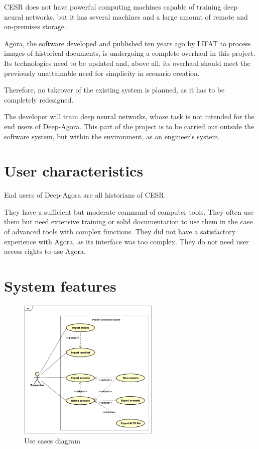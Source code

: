 \documentclass{polytech/polytech}
\numberwithin{figure}{chapter}
\begin{document}
CESR does not have powerful computing machines capable of training deep neural networks, but it has several machines and a large amount of remote and on-premises storage.

Agora, the software developed and published ten years ago by LIFAT to process images of historical documents, is undergoing a complete overhaul in this project. Its technologies need to be updated and, above all, its overhaul should meet the previously unattainable need for simplicity in scenario creation.

Therefore, no takeover of the existing system is planned, as it has to be completely redesigned.

The developer will train deep neural networks, whose task is not intended for the end users of Deep-Agora. This part of the project is to be carried out outside the software system, but within the environment, as an engineer's system.


\section{User characteristics}

End users of Deep-Agora are all historians of CESR.

They have a sufficient but moderate command of computer tools.
They often use them but need extensive training or solid documentation to use them in the case of advanced tools with complex functions.
They did not have a satisfactory experience with Agora, as its interface was too complex.
They do not need user access rights to use Agora.


\section{System features}

\begin{figure}[ht] 
    \centering 
    \includegraphics[width=0.6\textwidth]{pic/20221116DiagUseCase.png} 
    \caption{Use cases diagram}
    \label{diagUC}
\end{figure}
\end{document}
